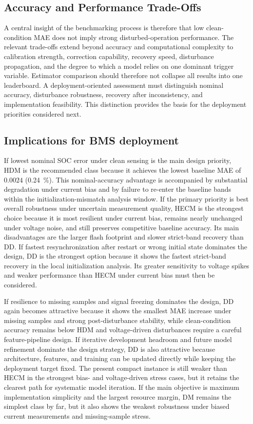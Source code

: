 \documentclass[
    a4paper,
    12pt,
    titlepage,
    bibliography=totoc,
    twoside=on,
    parskip=false,
    numbers=noenddot,
    cleardoublepage=empty,
    DIV=12,
    BCOR=12.0mm,
    headheight=36pt,
    headings=openright
]{scrreprt}
\begin{document}
\subsection{Accuracy and Performance Trade-Offs}
A central insight of the benchmarking process is therefore that low clean-condition MAE does not imply strong disturbed-operation performance. The relevant trade-offs extend beyond accuracy and computational complexity to calibration strength, correction capability, recovery speed, disturbance propagation, and the degree to which a model relies on one dominant trigger variable. Estimator comparison should therefore not collapse all results into one leaderboard. A deployment-oriented assessment must distinguish nominal accuracy, disturbance robustness, recovery after inconsistency, and implementation feasibility. This distinction provides the basis for the deployment priorities considered next.

\subsection{Implications for BMS deployment}
\label{sec:robustness_decision_interpretation}
If lowest nominal SOC error under clean sensing is the main design priority, HDM is the recommended class because it achieves the lowest baseline MAE of $0.0024$ (\SI{0.24}{\percent}). This nominal-accuracy advantage is accompanied by substantial degradation under current bias and by failure to re-enter the baseline bands within the initialization-mismatch analysis window. If the primary priority is best overall robustness under uncertain measurement quality, HECM is the strongest choice because it is most resilient under current bias, remains nearly unchanged under voltage noise, and still preserves competitive baseline accuracy. Its main disadvantages are the larger flash footprint and slower strict-band recovery than DD. If fastest resynchronization after restart or wrong initial state dominates the design, DD is the strongest option because it shows the fastest strict-band recovery in the local initialization analysis. Its greater sensitivity to voltage spikes and weaker performance than HECM under current bias must then be considered.

If resilience to missing samples and signal freezing dominates the design, DD again becomes attractive because it shows the smallest MAE increase under missing samples and strong post-disturbance stability, while clean-condition accuracy remains below HDM and voltage-driven disturbances require a careful feature-pipeline design. If iterative development headroom and future model refinement dominate the design strategy, DD is also attractive because architecture, features, and training can be updated directly while keeping the deployment target fixed. The present compact instance is still weaker than HECM in the strongest bias- and voltage-driven stress cases, but it retains the clearest path for systematic model iteration. If the main objective is maximum implementation simplicity and the largest resource margin, DM remains the simplest class by far, but it also shows the weakest robustness under biased current measurements and missing-sample stress.
\end{document}
